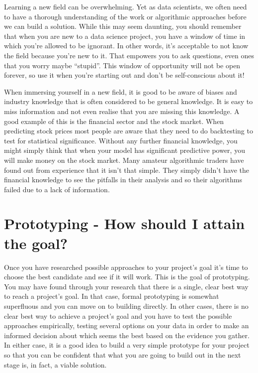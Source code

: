 \documentclass[
]{book}
\begin{document}
Learning a new field can be overwhelming. Yet as data scientists, we often need to have a thorough understanding of the work or algorithmic approaches before we can build a solution. While this may seem daunting, you should remember that when you are new to a data science project, you have a window of time in which you're allowed to be ignorant. In other words, it's acceptable to not know the field because you're new to it. That empowers you to ask questions, even ones that you worry maybe ``stupid''. This window of opportunity will not be open forever, so use it when you're starting out and don't be self-conscious about it!

When immersing yourself in a new field, it is good to be aware of biases and industry knowledge that is often considered to be general knowledge. It is easy to miss information and not even realise that you are missing this knowledge. A good example of this is the financial sector and the stock market. When predicting stock prices most people are aware that they need to do backtesting to test for statistical significance. Without any further financial knowledge, you might simply think that when your model has significant predictive power, you will make money on the stock market. Many amateur algorithmic traders have found out from experience that it isn't that simple. They simply didn't have the financial knowledge to see the pitfalls in their analysis and so their algorithms failed due to a lack of information.

\hypertarget{prototyping---how-should-i-attain-the-goal}{%
\section{Prototyping - How should I attain the goal?}\label{prototyping---how-should-i-attain-the-goal}}

Once you have researched possible approaches to your project's goal it's time to choose the best candidate and see if it will work. This is the goal of prototyping. You may have found through your research that there is a single, clear best way to reach a project's goal. In that case, formal prototyping is somewhat superfluous and you can move on to building directly. In other cases, there is no clear best way to achieve a project's goal and you have to test the possible approaches empirically, testing several options on your data in order to make an informed decision about which seems the best based on the evidence you gather. In either case, it is a good idea to build a very simple prototype for your project so that you can be confident that what you are going to build out in the next stage is, in fact, a viable solution.
\end{document}
